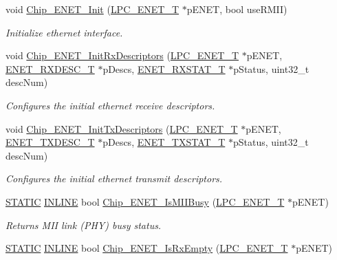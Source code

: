 \begin{DoxyCompactItemize}
void \hyperlink{group__ENET__17XX__40XX_ga24a13ad31f70570906a4b885754f8953}{Chip\+\_\+\+E\+N\+E\+T\+\_\+\+Init} (\hyperlink{structLPC__ENET__T}{L\+P\+C\+\_\+\+E\+N\+E\+T\+\_\+T} $\ast$p\+E\+N\+ET, bool use\+R\+M\+II)
\begin{DoxyCompactList}\small\item\em Initialize ethernet interface. \end{DoxyCompactList}\item 
void \hyperlink{group__ENET__17XX__40XX_ga04559be4fcfb24203ce9e372750383c1}{Chip\+\_\+\+E\+N\+E\+T\+\_\+\+Init\+Rx\+Descriptors} (\hyperlink{structLPC__ENET__T}{L\+P\+C\+\_\+\+E\+N\+E\+T\+\_\+T} $\ast$p\+E\+N\+ET, \hyperlink{structENET__RXDESC__T}{E\+N\+E\+T\+\_\+\+R\+X\+D\+E\+S\+C\+\_\+T} $\ast$p\+Descs, \hyperlink{structENET__RXSTAT__T}{E\+N\+E\+T\+\_\+\+R\+X\+S\+T\+A\+T\+\_\+T} $\ast$p\+Status, uint32\+\_\+t desc\+Num)
\begin{DoxyCompactList}\small\item\em Configures the initial ethernet receive descriptors. \end{DoxyCompactList}\item 
void \hyperlink{group__ENET__17XX__40XX_ga1e57967b888b1a7bfd4313fd9e70c696}{Chip\+\_\+\+E\+N\+E\+T\+\_\+\+Init\+Tx\+Descriptors} (\hyperlink{structLPC__ENET__T}{L\+P\+C\+\_\+\+E\+N\+E\+T\+\_\+T} $\ast$p\+E\+N\+ET, \hyperlink{structENET__TXDESC__T}{E\+N\+E\+T\+\_\+\+T\+X\+D\+E\+S\+C\+\_\+T} $\ast$p\+Descs, \hyperlink{structENET__TXSTAT__T}{E\+N\+E\+T\+\_\+\+T\+X\+S\+T\+A\+T\+\_\+T} $\ast$p\+Status, uint32\+\_\+t desc\+Num)
\begin{DoxyCompactList}\small\item\em Configures the initial ethernet transmit descriptors. \end{DoxyCompactList}\item 
\hyperlink{group__LPC__Types__Public__Macros_ga10b2d890d871e1489bb02b7e70d9bdfb}{S\+T\+A\+T\+IC} \hyperlink{group__LPC__Types__Public__Types_ga2eb6f9e0395b47b8d5e3eeae4fe0c116}{I\+N\+L\+I\+NE} bool \hyperlink{group__ENET__17XX__40XX_ga2ae5389a2b99d6006980083d02667e07}{Chip\+\_\+\+E\+N\+E\+T\+\_\+\+Is\+M\+I\+I\+Busy} (\hyperlink{structLPC__ENET__T}{L\+P\+C\+\_\+\+E\+N\+E\+T\+\_\+T} $\ast$p\+E\+N\+ET)
\begin{DoxyCompactList}\small\item\em Returns M\+II link (P\+HY) busy status. \end{DoxyCompactList}\item 
\hyperlink{group__LPC__Types__Public__Macros_ga10b2d890d871e1489bb02b7e70d9bdfb}{S\+T\+A\+T\+IC} \hyperlink{group__LPC__Types__Public__Types_ga2eb6f9e0395b47b8d5e3eeae4fe0c116}{I\+N\+L\+I\+NE} bool \hyperlink{group__ENET__17XX__40XX_ga19412cfa444b976f9ec13554da17d210}{Chip\+\_\+\+E\+N\+E\+T\+\_\+\+Is\+Rx\+Empty} (\hyperlink{structLPC__ENET__T}{L\+P\+C\+\_\+\+E\+N\+E\+T\+\_\+T} $\ast$p\+E\+N\+ET)

\end{DoxyCompactItemize}

